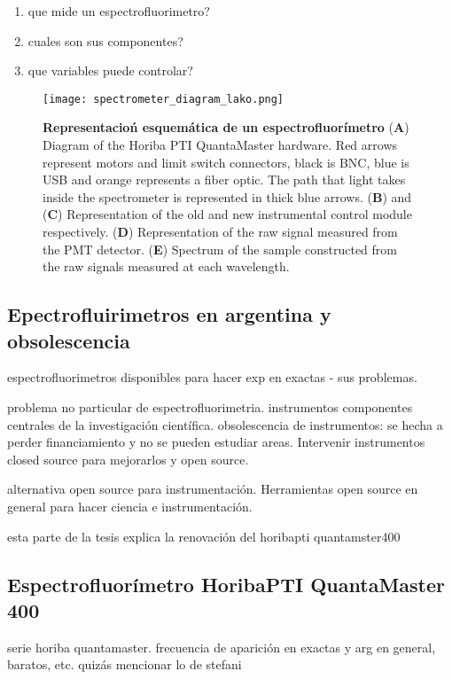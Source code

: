 \begin{enumerate}
    \item que mide un espectrofluorimetro?
    \item cuales son sus componentes?
    \item que variables puede controlar?
\end{enumerate}

\begin{figure}[btp]
     \centering
     \texttt{[image: spectrometer\_diagram\_lako.png]}
     \caption{
    \textbf{Representacioń esquemática de un espectrofluorímetro}
    (\textbf{A}) Diagram of the Horiba PTI QuantaMaster hardware. Red arrows represent motors and limit switch connectors, black is BNC, blue is USB and orange represents a fiber optic. The path that light takes inside the spectrometer is represented in thick blue arrows. 
    (\textbf{B}) and (\textbf{C}) Representation of the old and new instrumental control module respectively.
    (\textbf{D}) Representation of the raw signal measured from the PMT detector.
    (\textbf{E}) Spectrum of the sample constructed from the raw signals measured at each wavelength.
    }
     \label{fig:spec_diagram_lako}
\end{figure}

\subsection{Epectrofluirimetros en argentina y obsolescencia}

espectrofluorimetros disponibles para hacer exp en exactas - sus problemas.

problema no particular de espectrofluorimetria. instrumentos componentes centrales de la investigación científica. obsolescencia de instrumentos: se hecha a perder financiamiento y no se pueden estudiar areas. Intervenir instrumentos closed source para mejorarlos y open source.

alternativa open source para instrumentación. Herramientas open source en general para hacer ciencia e instrumentación.

esta parte de la tesis explica la renovación del horibapti quantamster400


\subsection{Espectrofluorímetro HoribaPTI QuantaMaster 400}

serie horiba quantamaster. frecuencia de aparición en exactas y arg en general, baratos, etc. quizás mencionar lo de stefani

